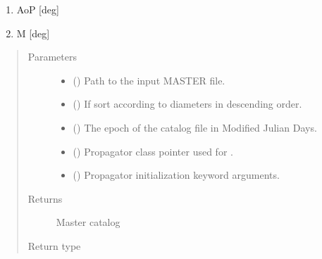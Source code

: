 \documentclass[letterpaper,10pt,english]{sphinxmanual}
\begin{document}
\begin{fulllineitems}
\begin{enumerate}
\item {} 
AoP {[}deg{]}

\item {} 
M {[}deg{]}

\end{enumerate}
\begin{quote}\begin{description}
\item[{Parameters}] \leavevmode\begin{itemize}
\item {} 
 () \textendash{} Path to the input MASTER file.

\item {} 
 () \textendash{} If  sort according to diameters in descending order.

\item {} 
 () \textendash{} The epoch of the catalog file in Modified Julian Days.

\item {} 
 ({\hyperref[\detokenize{modules/propagator_base:propagator_base.PropagatorBase}]{}}) \textendash{} Propagator class pointer used for {\hyperref[\detokenize{modules/space_object:space_object.SpaceObject}]{}}.

\item {} 
 () \textendash{} Propagator initialization keyword arguments.

\end{itemize}

\item[{Returns}] \leavevmode
Master catalog

\item[{Return type}] \leavevmode
{\hyperref[\detokenize{modules/population:population.Population}]{}}

\end{description}\end{quote}

\end{fulllineitems}
\end{document}
